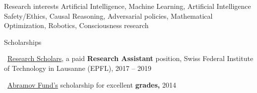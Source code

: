 \documentclass{resume} %
\newcommand{\mylink}{{\color{gray}\faExternalLink}}
\begin{document}
\begin{rSection}{Research interests}
	Artificial Intelligence, Machine Learning, Artificial Intelligence Safety/Ethics, Causal Reasoning, Adversarial policies, Mathematical Optimization, Robotics, Consciousness research %
\end{rSection}

\begin{rSection}{Scholarships}
	\vspace{-1em}
	\item \mylink~\href{https://ic.epfl.ch/ResearchScholars}{Research Scholars}, a paid {\bf Research Assistant} position, Swiss Federal Institute of Technology in Lausanne (EPFL), 2017 -- 2019
	\item \mylink~\href{http://phystech-foundation.org/}{Abramov Fund's} scholarship for excellent {\bf grades,} 2014
\end{rSection}
\end{document}
